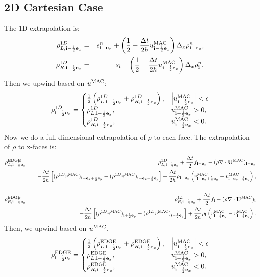 \documentclass[11pt]{article}
\def\half  {\frac{1}{2}}
\def\dt    {\Delta t}
\def\edge  {\rm EDGE}
\def\mac   {\rm MAC}
\def\eb    {{\bf e}}
\def\ib    {{\bf i}}
\def\Ub    {{\bf U}}
\begin{document}
\subsection{2D Cartesian Case}
The 1D extrapolation is:
\begin{eqnarray}
\rho_{L,\ib-\half\eb_x}^{1D} &=& s_{\ib-\eb_x}^n + \left(\half - \frac{\dt}{2h}u_{\ib-\half\eb_x}^{\mac}\right)\Delta_x \rho_{\ib-\eb_x}^n, \\
\rho_{R,\ib-\half\eb_x}^{1D} &=& s_{\ib} - \left(\half + \frac{\dt}{2h}u_{\ib-\half\eb_x}^{\mac}\right)\Delta_x \rho_{\ib}^n.
\end{eqnarray}
Then we upwind based on $u^{\mac}$:
\begin{equation}
\rho_{\ib-\half\eb_x}^{1D} =
\begin{cases}
\half\left(\rho_{L,\ib-\half\eb_x}^{1D} + \rho_{R,\ib-\half\eb_x}^{1D}\right), & \left|u^{\mac}_{\ib-\half\eb_x}\right| < \epsilon \\
\rho_{L,\ib-\half\eb_x}^{1D}, & u^{\mac}_{\ib-\half\eb_x} > 0, \\
\rho_{R,\ib-\half\eb_x}^{1D}, & u^{\mac}_{\ib-\half\eb_x} < 0. \\
\end{cases}
\end{equation}
Now we do a full-dimensional extrapolation of $\rho$ to each face.  The extrapolation of $\rho$ to x-faces is:
\begin{eqnarray}
\rho_{L,\ib-\half\eb_x}^{\edge} &=& \rho_{L,\ib-\half\eb_x}^{1D} + \frac{\dt}{2}f_{\ib-\eb_x} - (\rho\nabla\cdot\Ub^{\mac})_{\ib-\eb_x} \nonumber \\
&&- \frac{\dt}{2h}\left[(\rho^{1D} v^{\mac})_{\ib-\eb_x+\half\eb_y} - (\rho^{1D} v^{\mac})_{\ib-\eb_x-\half\eb_y}\right] + \frac{\dt}{2h}\rho_{\ib-\eb_x}\left(v_{\ib-\eb_x+\half\eb_y}^{\mac} - v_{\ib-\eb_x-\half\eb_y}^{\mac}\right), \nonumber \\
&& \\
\rho_{R,\ib-\half\eb_x}^{\edge} &=& \rho_{R,\ib-\half\eb_x}^{1D} + \frac{\dt}{2}f_{\ib} - (\rho\nabla\cdot\Ub^{\mac})_{\ib} \nonumber \\
&&- \frac{\dt}{2h}\left[(\rho^{1D} v^{\mac})_{\ib+\half\eb_y} - (\rho^{1D} v^{\mac})_{\ib-\half\eb_y}\right] + \frac{\dt}{2h}\rho_{\ib}\left(v_{\ib+\half\eb_y}^{\mac} - v_{\ib-\half\eb_y}^{\mac}\right).
\end{eqnarray}
Then, we upwind based on $u^{\mac}$.
\begin{equation}
\rho_{\ib-\half\eb_x}^{\edge} =
\begin{cases}
\half\left(\rho_{L,\ib-\half\eb_x}^{\edge} + \rho_{R,\ib-\half\eb_x}^{\edge}\right), & \left|u^{\mac}_{\ib-\half\eb_x}\right| < \epsilon \\
\rho_{L,\ib-\half\eb_x}^{\edge}, & u^{\mac}_{\ib-\half\eb_x} > 0, \\
\rho_{R,\ib-\half\eb_x}^{\edge}, & u^{\mac}_{\ib-\half\eb_x} < 0.
\end{cases}
\end{equation}
\end{document}
